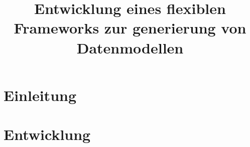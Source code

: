 \documentclass{book}
\title{Entwicklung eines flexiblen Frameworks zur generierung von Datenmodellen}
\begin{document}
\maketitle
\tableofcontents
\chapter{Einleitung}

\chapter{Entwicklung}

%
\end{document}
